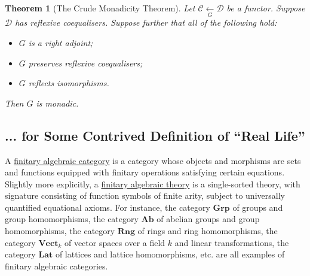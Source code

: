\documentclass[a4paper,11pt]{article}
\theoremstyle{break_italics}
\newtheorem*{theorem*}{Theorem}
\theoremstyle{break_upright}
\theoremstyle{remark}
\newcommand{\C}{\mathcal{C}}
\newcommand{\D}{\mathcal{D}}
\begin{document}
\begin{theorem*}[The Crude Monadicity Theorem]
	Let $\C \xleftarrow[G]{} \D$ be a functor. Suppose $\D$ has reflexive coequalisers. Suppose further that all of the following hold:
	\begin{itemize}
		\item $G$ is a right adjoint;
		\item $G$ preserves reflexive coequalisers;
		\item $G$ reflects isomorphisms.
	\end{itemize}
	Then $G$ is monadic.
\end{theorem*}







\subsection{... for Some Contrived Definition of ``Real Life''}

A \uline{finitary algebraic category} is a category whose objects and morphisms are sets and functions equipped with finitary operations satisfying certain equations. Slightly more explicitly, a \uline{finitary algebraic theory} is a single-sorted theory, with signature consisting of function symbols of finite arity, subject to universally quantified equational axioms. For instance, the category $\mathbf{Grp}$ of groups and group homomorphisms, the category $\mathbf{Ab}$ of abelian groups and group homomorphisms, the category $\mathbf{Rng}$ of rings and ring homomorphisms, the category $\mathbf{Vect}_k$ of vector spaces over a field $k$ and linear transformations, the category $\mathbf{Lat}$ of lattices and lattice homomorphisms, etc. are all examples of finitary algebraic categories.
\end{document}
